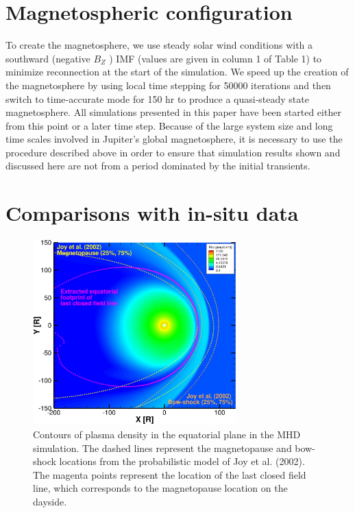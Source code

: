 \section{Magnetospheric configuration}
To create the magnetosphere, we use steady solar wind conditions with a southward (negative $B_Z$ ) IMF (values are given in column 1 of Table 1) to minimize reconnection at the start of the simulation. We speed up the creation of the magnetosphere by using local time stepping \cite{Toth2012a} for 50000 iterations and then switch to time‐accurate mode for 150 hr to produce a quasi‐steady state magnetosphere. All simulations presented in this paper have been started either from this point or a later time step. Because of the large system size and long time scales involved in Jupiter's global magnetosphere, it is necessary to use the procedure described above in order to ensure that simulation results shown and discussed here are not from a period dominated by the initial transients.


\section{Comparisons with in-situ data}

\begin{figure}
    \centering
    \includegraphics[width=0.7\textwidth]{images2/magnetopause-xy.jpg}
    \caption{Contours of plasma density in the equatorial plane in the MHD simulation. The dashed lines represent the magnetopause and bow-shock locations from the probabilistic model of Joy et al. (2002). The magenta points represent the location of the last closed field line, which corresponds to the magnetopause location on the dayside.}
    \label{fig:magnetopause-xy}
\end{figure}

